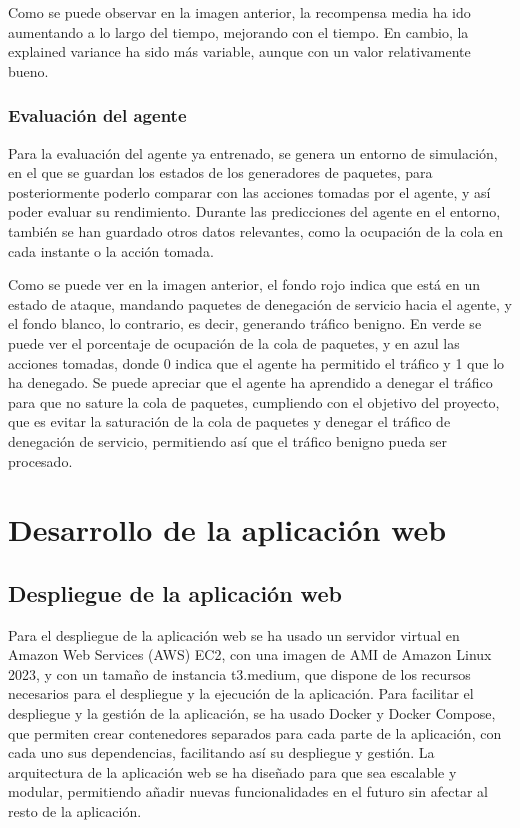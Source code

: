 
Como se puede observar en la imagen anterior, la recompensa media ha ido aumentando a lo largo del tiempo, mejorando con el tiempo. En cambio, la explained variance ha sido más variable, aunque con un valor relativamente bueno.

\subsubsection{Evaluación del agente}
Para la evaluación del agente ya entrenado, se genera un entorno de simulación, en el que se guardan los estados de los generadores de paquetes, para posteriormente poderlo comparar con las acciones tomadas por el agente, y así poder evaluar su rendimiento.
Durante las predicciones del agente en el entorno, también se han guardado otros datos relevantes, como la ocupación de la cola en cada instante o la acción tomada.


Como se puede ver en la imagen anterior, el fondo rojo indica que está en un estado de ataque, mandando paquetes de denegación de servicio hacia el agente, y el fondo blanco, lo contrario, es decir, generando tráfico benigno. En verde se puede ver el porcentaje de ocupación de la cola de paquetes, y en azul las acciones tomadas, donde 0 indica que el agente ha permitido el tráfico y 1 que lo ha denegado. Se puede apreciar que el agente ha aprendido a denegar el tráfico para que no sature la cola de paquetes, cumpliendo con el objetivo del proyecto, que es evitar la saturación de la cola de paquetes y denegar el tráfico de denegación de servicio, permitiendo así que el tráfico benigno pueda ser procesado.

\section{Desarrollo de la aplicación web}


\subsection{Despliegue de la aplicación web}
Para el despliegue de la aplicación web se ha usado un servidor virtual en Amazon Web Services (AWS) EC2, con una imagen de AMI de Amazon Linux 2023, y con un tamaño de instancia t3.medium, que dispone de los recursos necesarios para el despliegue y la ejecución de la aplicación.
Para facilitar el despliegue y la gestión de la aplicación, se ha usado Docker y Docker Compose, que permiten crear contenedores separados para cada parte de la aplicación, con cada uno sus dependencias, facilitando así su despliegue y gestión.
La arquitectura de la aplicación web se ha diseñado para que sea escalable y modular, permitiendo añadir nuevas funcionalidades en el futuro sin afectar al resto de la aplicación.

